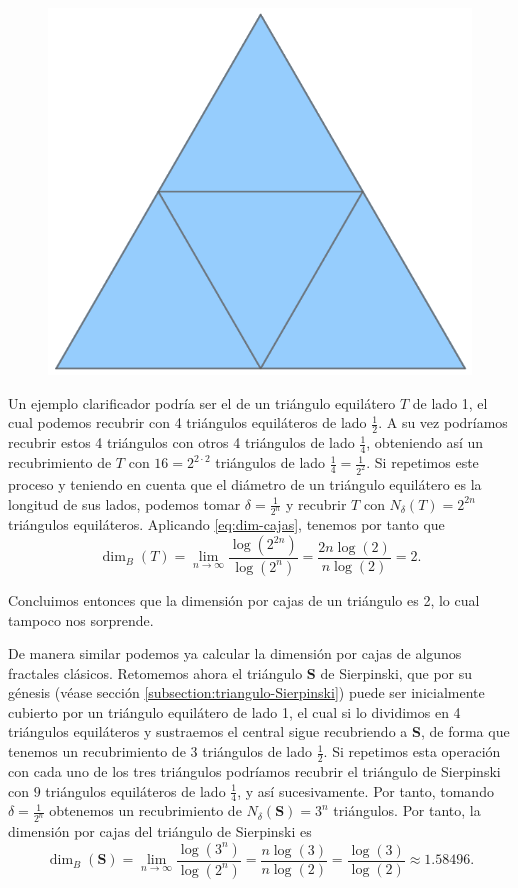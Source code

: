 \begin{figure}
\includegraphics[scale=0.14, trim={0cm 0.35cm 0cm 0.5cm}, clip]{./img/triangulo-dividido.png}
\end{figure}
Un ejemplo clarificador podría ser el de un triángulo equilátero $T$ de lado 1, el cual podemos recubrir con 4 triángulos equiláteros de lado $\frac 1 2$. A su vez podríamos recubrir estos 4 triángulos con otros 4 triángulos de lado $\frac{1}{4}$, obteniendo así un recubrimiento de $T$ con $16=2^{2\cdot 2}$ triángulos de lado $\frac{1}{4}=\frac{1}{2^2}$. Si repetimos este proceso y teniendo en cuenta que el diámetro de un triángulo equilátero es la longitud de sus lados, podemos tomar $\delta=\frac{1}{2^n}$ y recubrir $T$ con $N_\delta(T)=2^{2n}$ triángulos equiláteros. Aplicando \ref{eq:dim-cajas}, tenemos por tanto que
$$
\dim_B(T)=\lim_{n\rightarrow\infty}\dfrac{\log(2^{2n})}{\log(2^n)} = \dfrac{2n\log(2)}{n\log(2)}=2.
$$

Concluimos entonces que la dimensión por cajas de un triángulo es 2, lo cual tampoco nos sorprende.

De manera similar podemos ya calcular la dimensión por cajas de algunos fractales clásicos. Retomemos ahora el triángulo \textbf{S} de Sierpinski, que por su génesis (véase sección \ref{subsection:triangulo-Sierpinski}) puede ser inicialmente cubierto por un triángulo equilátero de lado 1, el cual si lo dividimos en 4 triángulos equiláteros y sustraemos el central sigue recubriendo a \textbf{S}, de forma que tenemos un recubrimiento de 3 triángulos de lado $\frac{1}{2}$. Si repetimos esta operación con cada uno de los tres triángulos podríamos recubrir el triángulo de Sierpinski con $9$ triángulos equiláteros de lado $\frac 1 4$, y así sucesivamente. Por tanto, tomando $\delta=\frac{1}{2^n}$ obtenemos un recubrimiento de $N_\delta(\mathbf{S})=3^n$ triángulos. Por tanto, la dimensión por cajas del triángulo de Sierpinski es 
$$
\dim_B(\mathbf{S})=\lim_{n\rightarrow\infty}\dfrac{\log(3^{n})}{\log(2^n)} = \dfrac{n\log(3)}{n\log(2)}=\dfrac{\log(3)}{\log(2)}\approx 1.58496.
$$

